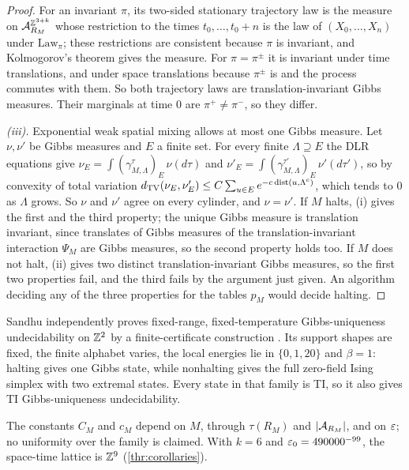 \begin{proof}
For an invariant $\pi$, its two-sided stationary trajectory law is the measure on $\mathcal{A}_{R_M}^{\mathbb{Z}^{3+k}}$ whose restriction to the times $t_0,\dots,t_0+n$ is the law of $(X_0,\dots,X_n)$ under $\mathrm{Law}_\pi$; these restrictions are consistent because $\pi$ is invariant, and Kolmogorov's theorem gives the measure. For $\pi=\pi^\pm$ it is invariant under time translations, and under space translations because $\pi^\pm$ is and the process commutes with them. So both trajectory laws are translation-invariant Gibbs measures. Their marginals at time $0$ are $\pi^+\ne\pi^-$, so they differ.

\emph{(iii).} Exponential weak spatial mixing allows at most one Gibbs measure. Let $\nu,\nu'$ be Gibbs measures and $E$ a finite set. For every finite $\Lambda\supseteq E$ the DLR equations give $\nu_E=\int(\gamma^\tau_{M,\Lambda})_E\,\nu(d\tau)$ and $\nu'_E=\int(\gamma^{\tau'}_{M,\Lambda})_E\,\nu'(d\tau')$, so by convexity of total variation $d_{\mathrm{TV}}(\nu_E,\nu'_E)\le C\sum_{u\in E}e^{-c\,\mathrm{dist}(u,\Lambda^c)}$, which tends to $0$ as $\Lambda$ grows. So $\nu$ and $\nu'$ agree on every cylinder, and $\nu=\nu'$. If $M$ halts, (i) gives the first and the third property; the unique Gibbs measure is translation invariant, since translates of Gibbs measures of the translation-invariant interaction $\Psi_M$ are Gibbs measures, so the second property holds too. If $M$ does not halt, (ii) gives two distinct translation-invariant Gibbs measures, so the first two properties fail, and the third fails by the argument just given. An algorithm deciding any of the three properties for the tables $p_M$ would decide halting.
\end{proof}

Sandhu independently proves fixed-range, fixed-temperature Gibbs-uniqueness undecidability on $\mathbb{Z}^2$ by a finite-certificate construction \cite[Theorem~1.1]{Sandhu26}. Its support shapes are fixed, the finite alphabet varies, the local energies lie in $\{0,1,20\}$ and $\beta=1$: halting gives one Gibbs state, while nonhalting gives the full zero-field Ising simplex with two extremal states. Every state in that family is TI, so it also gives TI Gibbs-uniqueness undecidability.

The constants $C_M$ and $c_M$ depend on $M$, through $\tau(R_M)$ and $|\mathcal{A}_{R_M}|$, and on $\varepsilon$; no uniformity over the family is claimed. With $k=6$ and $\varepsilon_0=490000^{-99}$, the space-time lattice is $\mathbb{Z}^9$ (\cref{thr:corollaries}).

